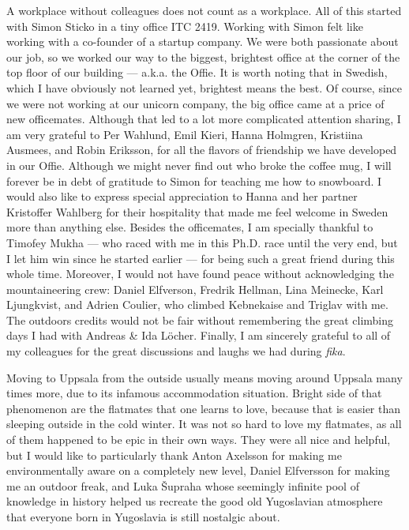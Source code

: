 \documentclass{UUThesisTemplate}
\begin{document}
{\par
A workplace without colleagues does not count as a workplace. All of this started with Simon Sticko in a tiny office ITC 2419. Working with Simon felt like working with a co-founder of a startup company. We were both passionate about our job, so we worked our way to the biggest, brightest office at the corner of the top floor of our building --- a.k.a. the Offie. It is worth noting that in Swedish, which I have obviously not learned yet, brightest means the best. Of course, since we were not working at our unicorn company, the big office came at a price of new officemates. Although that led to a lot more complicated attention sharing, I am very grateful to Per Wahlund, Emil Kieri, Hanna Holmgren, Kristiina Ausmees, and Robin Eriksson, for all the flavors of friendship we have developed in our Offie. Although we might never find out who broke the coffee mug, I will forever be in debt of gratitude to Simon for teaching me how to snowboard. I would also like to express special appreciation to Hanna and her partner Kristoffer Wahlberg for their hospitality that made me feel welcome in Sweden more than anything else. Besides the officemates, I am specially thankful to Timofey Mukha --- who raced with me in this Ph.D. race until the very end, but I let him win since he started earlier --- for being such a great friend during this whole time. Moreover, I would not have found peace without acknowledging the mountaineering crew: Daniel Elfverson, Fredrik Hellman, Lina Meinecke, Karl Ljungkvist, and Adrien Coulier, who climbed Kebnekaise and Triglav with me. The outdoors credits would not be fair without remembering the great climbing days I had with Andreas \& Ida Löcher. Finally, I am sincerely grateful to all of my colleagues for the great discussions and laughs we had during \emph{fika}. 

\par
Moving to Uppsala from the outside usually means moving around Uppsala many times more, due to its infamous accommodation situation. Bright side of that phenomenon are the flatmates that one learns to love, because that is easier than sleeping outside in the cold winter. It was not so hard to love my flatmates, as all of them happened to be epic in their own ways. They were all nice and helpful, but I would like to particularly thank Anton Axelsson for making me environmentally aware on a completely new level, Daniel Elfversson for making me an outdoor freak, and Luka Šupraha whose seemingly infinite pool of knowledge in history helped us recreate the good old Yugoslavian atmosphere that everyone born in Yugoslavia is still nostalgic about.

}
\end{document}
